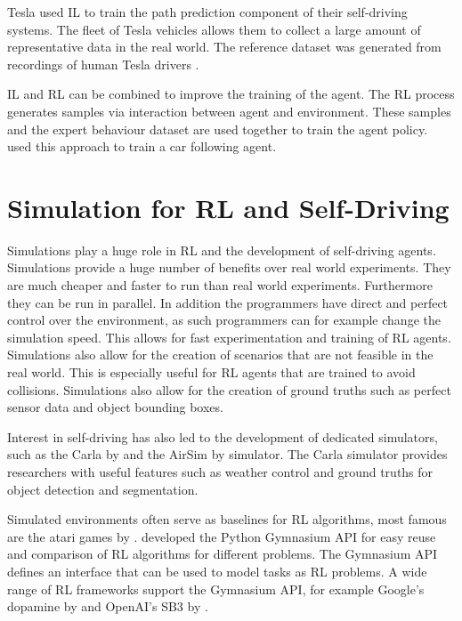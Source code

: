 Tesla used \ac{IL} to train the path prediction component of their self-driving systems. The fleet of Tesla vehicles allows them to collect a large amount of representative data in the real world. The reference dataset was generated from recordings of human Tesla drivers \textcite{tesla_youtube}. 

\ac{IL} and \ac{RL} can be combined to improve the training of the agent. The \ac{RL} process generates samples via interaction between agent and environment. These samples and the expert behaviour dataset are used together to train the agent policy. \textcite{car-following_carla_dresden} used this approach to train a car following agent.



\section{Simulation for \ac{RL} and Self-Driving}

Simulations play a huge role in \ac{RL} and the development of self-driving agents. Simulations provide a huge number of benefits over real world experiments. They are much cheaper and faster to run than real world experiments. Furthermore they can be run in parallel. In addition the programmers have direct and perfect control over the environment, as such programmers can for example change the simulation speed. This allows for fast experimentation and training of \ac{RL} agents. Simulations also allow for the creation of scenarios that are not feasible in the real world. This is especially useful for \ac{RL} agents that are trained to avoid collisions. Simulations also allow for the creation of ground truths such as perfect sensor data and object bounding boxes.

Interest in self-driving has also led to the development of dedicated simulators, such as the Carla by \textcite{carla} and the AirSim by \textcite{airsim} simulator. The Carla simulator provides researchers with useful features such as weather control and ground truths for object detection and segmentation.

Simulated environments often serve as baselines for \ac{RL} algorithms, most famous are the atari games by \textcite{atari}. \textcite{gymnasium} developed the Python Gymnasium API for easy reuse and comparison of \ac{RL} algorithms for different problems. The Gymnasium API defines an interface that can be used to model tasks as \ac{RL} problems. A wide range of \ac{RL} frameworks support the Gymnasium API, for example Google's dopamine by \textcite{dopamine} and OpenAI's \ac{SB3} by \textcite{sb3}. 

